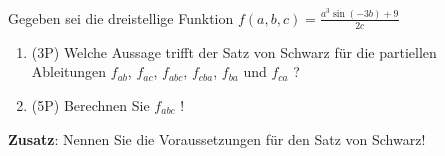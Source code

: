 Gegeben sei die dreistellige Funktion $f(a,b,c) = \frac{a^3\sin(-3b)+9}{2c}$

\begin{enumerate}[label=(\alph*)]

	\item (3P) Welche Aussage trifft der Satz von Schwarz für die partiellen Ableitungen $f_{ab}$, $f_{ac}$, $f_{abc}$, $f_{cba}$, $f_{ba}$ und $f_{ca}$ ?
		\bigskip
		\bigskip
		\bigskip
		\bigskip
		\bigskip
		\bigskip
		\bigskip
		\bigskip
		
	\item (5P) Berechnen Sie $f_{abc}$ !

\end{enumerate}

\bigskip
\bigskip
\bigskip
\bigskip
\bigskip
\bigskip
\bigskip
\bigskip
\bigskip
\bigskip
\bigskip
\bigskip
\bigskip
\bigskip
\bigskip
\bigskip
\bigskip
\bigskip
\bigskip
\bigskip
\bigskip
\bigskip
\bigskip
\bigskip
\bigskip
\bigskip
\bigskip
\bigskip
\bigskip
\bigskip
\bigskip
\bigskip
\bigskip
\bigskip
\bigskip

\textbf{Zusatz}: Nennen Sie die Voraussetzungen für den Satz von Schwarz!
